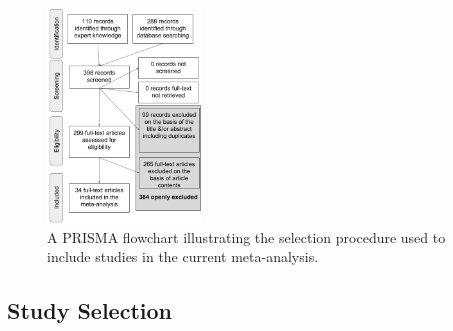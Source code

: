 \documentclass[man]{apa6}
\begin{document}
\begin{figure}
\includegraphics[width=1.6in]{figures/Figure_1_PRISMA_MA_Mispronunciation} \caption{A PRISMA flowchart illustrating the selection procedure used to include studies in the current meta-analysis.}\label{fig:PRISMA-image}
\end{figure}

\hypertarget{study-selection}{%
\subsection{Study Selection}\label{study-selection}}
\end{document}

